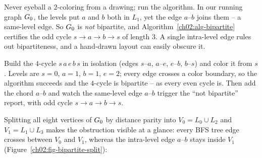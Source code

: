 \begin{trapbox}
Never eyeball a $2$-coloring from a drawing; run the algorithm. In our running
graph $G_0$, the levels put $a$ and $b$ both in $L_1$, yet the edge $a$--$b$
joins them -- a same-level edge. So $G_0$ is \emph{not} bipartite, and
Algorithm~\ref{ch02:alg-bipartite} certifies the odd cycle $s\to a\to b\to s$ of
length $3$. A single intra-level edge rules out bipartiteness, and a
hand-drawn layout can easily obscure it.
\end{trapbox}

\begin{labbox}
Build the $4$-cycle $s\,a\,e\,b\,s$ in isolation (edges $s$--$a$, $a$--$e$,
$e$--$b$, $b$--$s$) and color it from $s$. Levels are $s{=}0$, $a{=}1$, $b{=}1$,
$e{=}2$; every edge crosses a color boundary, so the algorithm succeeds and the
$4$-cycle is bipartite -- as every even cycle is. Then add the chord $a$--$b$ and
watch the same-level edge $a$--$b$ trigger the ``not bipartite'' report, with odd
cycle $s\to a\to b\to s$.
\end{labbox}

Splitting all eight vertices of $G_0$ by distance parity into $V_0 = L_0 \cup L_2$
and $V_1 = L_1 \cup L_3$ makes the obstruction visible at a glance: every BFS tree
edge crosses between $V_0$ and $V_1$, whereas the intra-level edge $a$--$b$ stays
inside $V_1$ (Figure~\ref{ch02:fig-bipartite-split}):

